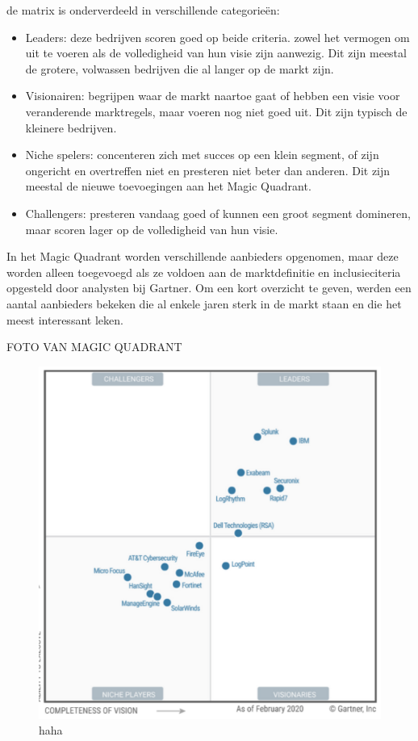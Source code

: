 de matrix is onderverdeeld in verschillende categorieën:

\begin{itemize}
    \item Leaders: deze bedrijven scoren goed op beide criteria. zowel het vermogen om uit te voeren als de volledigheid van hun visie zijn aanwezig. Dit zijn meestal de grotere, volwassen bedrijven die al langer op de markt zijn.
    
    \item Visionairen: begrijpen waar de markt naartoe gaat of hebben een visie voor veranderende marktregels, maar voeren nog niet goed uit. Dit zijn typisch de kleinere bedrijven.
    
    \item Niche spelers: concenteren zich met succes op een klein segment, of zijn ongericht en overtreffen niet en presteren niet beter dan anderen. Dit zijn meestal de nieuwe toevoegingen aan het Magic Quadrant.
    
    \item Challengers: presteren vandaag goed of kunnen een groot segment domineren, maar scoren lager op de volledigheid van hun visie.
\end{itemize}

In het Magic Quadrant worden verschillende aanbieders opgenomen, maar deze worden alleen toegevoegd als ze voldoen aan de marktdefinitie en inclusieciteria opgesteld door analysten bij Gartner.
Om een kort overzicht te geven, werden een aantal aanbieders bekeken die al enkele jaren sterk in de markt staan en die het meest interessant leken.

FOTO VAN MAGIC QUADRANT
\begin{figure}
    \includegraphics[scale=1.50]{gartner} haha
\end{figure}

